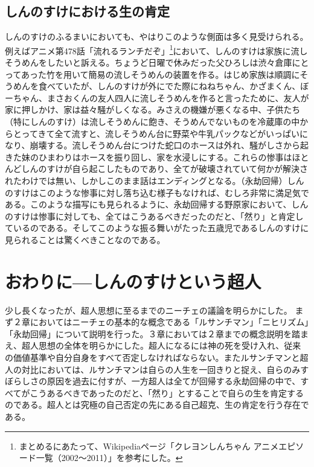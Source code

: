 \documentclass[b5j,twoside,twocolumn]{utarticle}
\begin{document}
\subsection{しんのすけにおける生の肯定}
しんのすけのふるまいにおいても、やはりこのような側面は多く見受けられる。例えばアニメ第478話「流れるランチだぞ」\footnote{まとめるにあたって、Wikipediaページ「クレヨンしんちゃん アニメエピソード一覧（2002～2011）」を参考にした。}において、しんのすけは家族に流しそうめんをしたいと訴える。ちょうど日曜で休みだった父ひろしは渋々倉庫にとってあった竹を用いて簡易の流しそうめんの装置を作る。はじめ家族は順調にそうめんを食べていたが、しんのすけが外にでた際にねねちゃん、かざまくん、ぼーちゃん、まさおくんの友人四人に流しそうめんを作ると言ったために、友人が家に押しかけ、家は益々騒がしくなる。みさえの機嫌が悪くなる中、子供たち（特にしんのすけ）は流しそうめんに飽き、そうめんでないものを冷蔵庫の中からとってきて全て流すと、流しそうめん台に野菜や牛乳パックなどがいっぱいになり、崩壊する。流しそうめん台につけた蛇口のホースは外れ、騒がしさから起きた妹のひまわりはホースを振り回し、家を水浸しにする。これらの惨事はほとんどしんのすけが自ら起こしたものであり、全てが破壊されていて何かが解決されたわけでは無い、しかしこのまま話はエンディングとなる。（永劫回帰）しんのすけはこのような惨事に対し落ち込む様子もなければ、むしろ非常に満足気である。このような描写にも見られるように、永劫回帰する野原家において、しんのすけは惨事に対しても、全てはこうあるべきだったのだと、「然り」と肯定しているのである。そしてこのような振る舞いがたった五歳児であるしんのすけに見られることは驚くべきことなのである。


\section{おわりに---しんのすけという超人}
少し長くなったが、超人思想に至るまでのニーチェの議論を明らかにした。
まず２章においてはニーチェの基本的な概念である「ルサンチマン」「ニヒリズム」「永劫回帰」について説明を行った。３章においては２章までの概念説明を踏まえ、超人思想の全体を明らかにした。超人になるには神の死を受け入れ、従来の価値基準や自分自身をすべて否定しなければならない。またルサンチマンと超人の対比においては、ルサンチマンは自らの人生を一回きりと捉え、自らのみすぼらしさの原因を過去に付すが、一方超人は全てが回帰する永劫回帰の中で、すべてがこうあるべきであったのだと、「然り」とすることで自らの生を肯定するのである。超人とは究極の自己否定の先にある自己超克、生の肯定を行う存在である。
\end{document}
